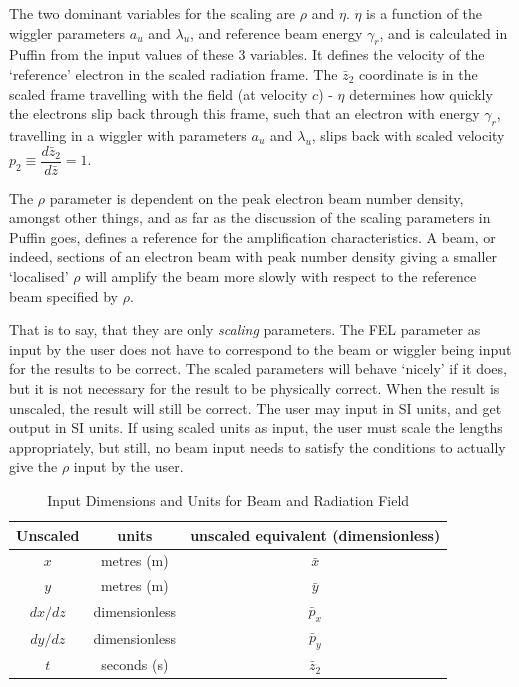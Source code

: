 \documentclass[12pt]{article}%
\begin{document}
The two dominant variables for the scaling are $\rho$ and $\eta$. $\eta$ is a function of the wiggler parameters $a_u$ and $\lambda_u$, and reference beam energy $\gamma_r$, and is calculated in Puffin from the input values of these 3 variables. It defines the velocity of the `reference' electron in the scaled radiation frame. The $\bar{z}_2$ coordinate is in the scaled frame travelling with the field (at velocity $c$) - $\eta$ determines how quickly the electrons slip back through this frame, such that an electron with energy $\gamma_r$, travelling in a wiggler with parameters $a_u$ and $\lambda_u$, slips back with scaled velocity $p_2 \equiv \dfrac{d \bar{z}_2}{d\bar{z}} = 1$.

The $\rho$ parameter is dependent on the peak electron beam number density, amongst other things, and as far as the discussion of the scaling parameters in Puffin goes, defines a reference for the amplification characteristics. A beam, or indeed, sections of an electron beam with peak number density giving a smaller `localised' $\rho$ will amplify the beam more slowly with respect to the reference beam specified by $\rho$.

That is to say, that they are only \textit{scaling} parameters. The FEL parameter as input by the user does not have to correspond to the beam or wiggler being input for the results to be correct. The scaled parameters will behave `nicely' if it does, but it is not necessary for the result to be physically correct. When the result is unscaled, the result will still be correct. The user may input in SI units, and get output in SI units. If using scaled units as input, the user must scale the lengths appropriately, but still, no beam input needs to satisfy the conditions to actually give the $\rho$ input by the user.






\begin{table}
\centering
\caption[Input Units]{Input Dimensions and Units for Beam and Radiation Field}
\begin{tabular}{|  c   | c  |   c   |}
\hline
Unscaled & units & unscaled equivalent (dimensionless) \\
\hline
$x$ & metres (m) & $\bar{x}$ \\
\hline
$y$ & metres (m) & $\bar{y}$ \\
\hline
$dx/dz$ & dimensionless & $\bar{p}_x$ \\
\hline
$dy/dz$ & dimensionless & $\bar{p}_y$ \\
\hline
$t$ & seconds (s) & $\bar{z}_2$ \\
\hline
\end{tabular}
\label{table}
\vspace*{-\baselineskip}
\end{table}
\end{document}
